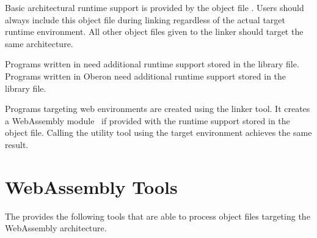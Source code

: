 Basic architectural runtime support is provided by the object file .
Users should always include this object file during linking regardless of the actual target runtime environment.
All other object files given to the linker should target the same architecture.

Programs written in \cpp{} need additional runtime support stored in the  library file.
Programs written in Oberon need additional runtime support stored in the  library file.
\seecpp\seeoberon

Programs targeting web environments are created using the  linker tool.
It creates a WebAssembly module~\cite{wasm:instructionset} if provided with the runtime support stored in the  object file.
Calling the  utility tool using the  target environment achieves the same result.

\section{WebAssembly Tools}

The \ecs{} provides the following tools that are able to process object files targeting the WebAssembly architecture.
\interface

\cdwasm
\cppwasm
\falwasm
\obwasm
\wasmasm
\wasmdism
\linkbin

\concludechapter
